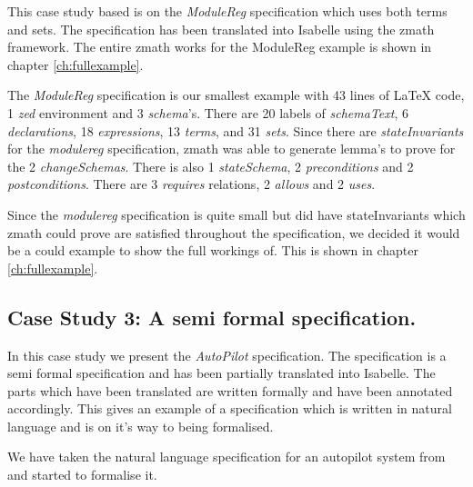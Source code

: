 This case study based is on the \emph{ModuleReg} specification which uses both terms and sets. The specification has been translated into Isabelle using the \gls{zmath} framework. The entire \gls{zmath} works for the ModuleReg example is shown in chapter \ref{ch:fullexample}.

The \emph{ModuleReg} specification is our smallest example with 43 lines of \LaTeX{} code, 1 \emph{zed} environment and 3 \emph{schema}'s. There are 20 labels of \emph{schemaText}, 6 \emph{declarations}, 18 \emph{expressions}, 13 \emph{terms}, and 31 \emph{sets}. Since there are \emph{stateInvariants} for the \emph{modulereg} specification, \gls{zmath} was able to generate lemma's to prove for the 2 \emph{changeSchemas}. There is also 1 \emph{stateSchema}, 2 \emph{preconditions} and 2 \emph{postconditions}. There are 3 \emph{requires} relations, 2 \emph{allows} and 2 \emph{uses}.

Since the \emph{modulereg} specification is quite small but did have stateInvariants which \gls{zmath} could prove are satisfied throughout the specification, we decided it would be a could example to show the full workings of. This is shown in chapter \ref{ch:fullexample}.

\subsection{Case Study 3: A semi formal specification.}

In this case study we present the \emph{AutoPilot} specification. The specification is a semi formal specification and has been partially translated into Isabelle. The parts which have been translated are written formally and have been annotated accordingly. This gives an example of a specification which is written in natural language and is on it's way to being formalised.

We have taken the natural language specification for an autopilot system from \cite{Butler96} and started to formalise it.

